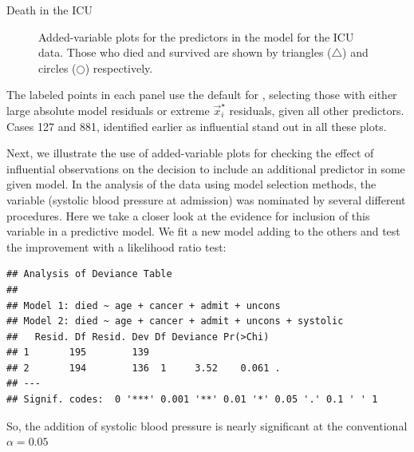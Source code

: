 \documentclass[11pt]{book}
\renewenvironment{knitrout}{\small\renewcommand{\baselinestretch}{.85}}{} %
\begin{document}
\begin{Example}[icu3]{Death in the ICU}
\begin{knitrout}
\begin{figure}[!htb]
\caption[Added-variable plots for the predictors in the model for the ICU data.]{Added-variable plots for the predictors in the model for the ICU data. Those who died and survived are shown by triangles ($\triangle$) and circles (\small{$\bigcirc$}) respectively.\label{fig:icu3-avp1}}
\end{figure}


\end{knitrout}
The labeled points in each panel use the default  for
, selecting those with either large absolute model residuals or
extreme $\vec{x}_i^\star$ residuals, given all other predictors.
Cases 127 and 881, identified earlier as influential stand out in all these
plots.

Next, we illustrate the use of added-variable plots for checking the 
effect of influential observations on the decision to include 
an additional predictor in some given model.  
In the analysis of the  data using model selection methods,
the variable  (systolic blood pressure at admission)
was nominated by several different procedures.  Here we take a closer look
at the evidence for inclusion of this variable in a predictive model.
We fit a new model adding  to the others and test
the improvement with a likelihood ratio test:
\begin{knitrout}
\color{fgcolor}\begin{kframe}
\begin{alltt}
 \hlkwb{<-}  \hlopt{~}  \hlopt{+}   \hlopt{+}  \hlopt{+}  \hlopt{+} 
                  
 \hlstd{=}\hlstd{)}
\end{alltt}
\begin{verbatim}
## Analysis of Deviance Table
## 
## Model 1: died ~ age + cancer + admit + uncons
## Model 2: died ~ age + cancer + admit + uncons + systolic
##   Resid. Df Resid. Dev Df Deviance Pr(>Chi)  
## 1       195        139                       
## 2       194        136  1     3.52    0.061 .
## ---
## Signif. codes:  0 '***' 0.001 '**' 0.01 '*' 0.05 '.' 0.1 ' ' 1
\end{verbatim}
\end{kframe}
\end{knitrout}
So, the addition of systolic blood pressure is nearly significant at the conventional $\alpha=0.05$

\end{Example}
\end{document}
